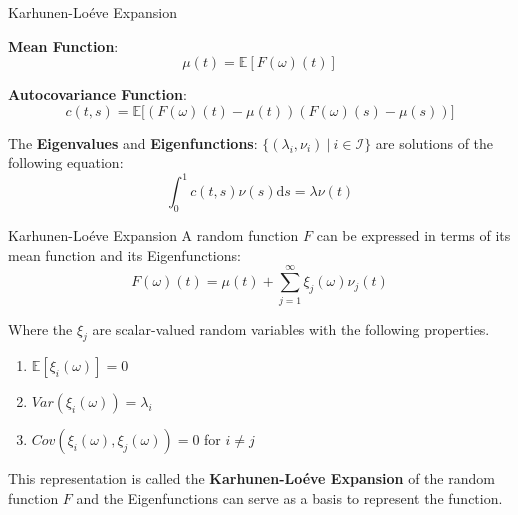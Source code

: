\documentclass{beamer}
\begin{document}
	\begin{frame}{Karhunen-Lo\'{e}ve Expansion}
		
		\textbf{Mean Function}: $$\mu(t) = \mathbb{E}\left[ F(\omega)(t) \right]$$

		\textbf{Autocovariance Function}: $$c(t,s) = \mathbb{E}\big[ \left( F(\omega)(t) - \mu(t) \right) \left( F(\omega)(s) - \mu(s) \right) \big]$$
		
		The \textbf{Eigenvalues} and \textbf{Eigenfunctions}: $\{(\lambda_i, \nu_i) \: \vert \: i \in \mathcal{I}\}$  are solutions of the following equation:
		$$ \int_{0}^{1}c(t,s)\nu(s) \mathrm{d}s = \lambda \nu(t) $$
	\end{frame}
	
	\begin{frame}{Karhunen-Lo\'{e}ve Expansion}
		A random function $F$ can be expressed in terms of its mean function and its Eigenfunctions:
		$$F(\omega)(t) = \mu(t) + \sum_{j = 1}^{\infty} \xi_j(\omega) \nu_j(t)$$
		
		Where the $\xi_j$ are scalar-valued random variables with the following properties.
		\begin{multicols}{2}
			\begin{enumerate}
				\item $\mathbb{E}[\xi_i(\omega)] = 0$
				\item $Var(\xi_i(\omega)) = \lambda_i$
				\item $Cov(\xi_i(\omega), \xi_j(\omega)) = 0$ for $i \neq j$
			\end{enumerate}
		\end{multicols}
		
		This representation is called the \textbf{Karhunen-Lo\'{e}ve Expansion} of the random function $F$ and the Eigenfunctions can serve as a basis to represent the function.
	\end{frame}
\end{document}
